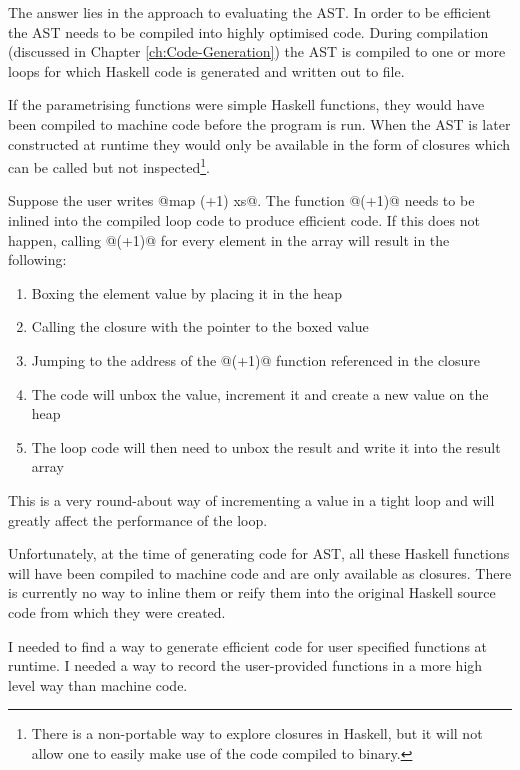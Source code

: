 \documentclass[preamble.tex]{subfiles}
\begin{document}
The answer lies in the approach to evaluating the AST. In order to be efficient the AST needs to be compiled into highly optimised code. During compilation (discussed in Chapter \ref{ch:Code-Generation}) the AST is compiled to one or more loops for which Haskell code is generated and written out to file.

If the parametrising functions were simple Haskell functions, they would have been compiled to machine code before the program is run. When the AST is later constructed at runtime they would only be available in the form of closures which can be called but not inspected\footnote{There is a non-portable way to explore closures in Haskell, but it will not allow one to easily make use of the code compiled to binary.}.

Suppose the user writes @map (+1) xs@. The function @(+1)@ needs to be inlined into the compiled loop code to produce efficient code. If this does not happen, calling @(+1)@ for every element in the array will result in the following:

\begin{enumerate}
\item Boxing the element value by placing it in the heap
\item Calling the closure with the pointer to the boxed value
\item Jumping to the address of the @(+1)@ function referenced in the closure
\item The code will unbox the value, increment it and create a new value on the heap
\item The loop code will then need to unbox the result and write it into the result array
\end{enumerate}

This is a very round-about way of incrementing a value in a tight loop and will greatly affect the performance of the loop.

Unfortunately, at the time of generating code for AST, all these Haskell functions will have been compiled to machine code and are only available as closures. There is currently no way to inline them or reify them into the original Haskell source code from which they were created.

I needed to find a way to generate efficient code for user specified functions at runtime. I needed a way to record the user-provided functions in a more high level way than machine code.
\end{document}
